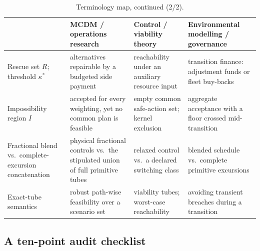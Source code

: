 \begin{table}[!htbp]
\centering\small
\caption{Terminology map, continued (2/2).}
\label{tab:translation-controls}
\begin{tabularx}{\textwidth}{@{}>{\raggedright\arraybackslash}p{}>{\raggedright\arraybackslash}X>{\raggedright\arraybackslash}X>{\raggedright\arraybackslash}X@{}}
\toprule
 & MCDM / operations research & Control / viability theory & Environmental modelling / governance \\
\midrule
Rescue set $R$; threshold $\kappa^*$ & alternatives repairable by a budgeted side payment & reachability under an auxiliary resource input & transition finance: adjustment funds or fleet buy-backs \\
\addlinespace
Impossibility region $I$ & accepted for every weighting, yet no common plan is feasible & empty common safe-action set; kernel exclusion & aggregate acceptance with a floor crossed mid-transition \\
\addlinespace
Fractional blend vs.\ complete-excursion concatenation & physical fractional controls vs.\ the stipulated union of full primitive tubes & relaxed control vs.\ a declared switching class & blended schedule vs.\ complete primitive excursions \\
\addlinespace
Exact-tube semantics & robust path-wise feasibility over a scenario set & viability tubes; worst-case reachability & avoiding transient breaches during a transition \\
\bottomrule
\end{tabularx}
\end{table}

\subsection{A ten-point audit checklist}

